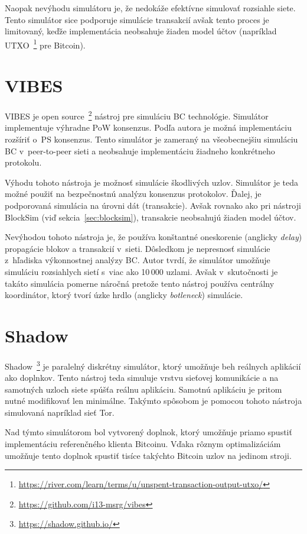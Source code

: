 Naopak nevýhodu simulátoru je, že nedokáže efektívne simulovať rozsiahle siete. Tento simulátor sice podporuje simulácie transakcií avšak tento proces je limitovaný, keďže implementácia neobsahuje žiaden model účtov (napríklad UTXO~\footnote{\url{https://river.com/learn/terms/u/unspent-transaction-output-utxo/}} pre Bitcoin).~\cite{fanPerfEval}

\section{VIBES}

VIBES je open source~\footnote{\url{https://github.com/i13-msrg/vibes}} nástroj pre simuláciu BC technológie. Simulátor implementuje výhradne PoW konsenzus. Podľa autora je možná implementáciu rozšíriť o~PS konsenzus. Tento simulátor je zameraný na všeobecnejšiu simuláciu BC v~peer-to-peer sieti a neobsahuje implementáciu žiadneho konkrétneho protokolu.~\cite{vibesWp}

Výhodu tohoto nástroja je možnosť simulácie škodlivých uzlov. Simulátor je teda možné použiť na bezpečnostnú analýzu konsenzus protokolov. Ďalej, je podporovaná simulácia na úrovni dát (transakcie). Avšak rovnako ako pri nástroji BlockSim (viď sekcia~\ref{sec:blocksim}), transakcie neobsahujú žiaden model účtov.

Nevýhodou tohoto nástroja je, že používa konštantné oneskorenie (anglicky \textit{delay}) propagácie blokov a transakcií v~sieti. Dôsledkom je nepresnosť simulácie z~hľadiska výkonnostnej analýzy BC. Autor tvrdí, že simulátor umožňuje simuláciu rozsiahlych sietí s~viac ako 10\,000 uzlami. Avšak v~skutočnosti je takáto simulácia pomerne náročná pretože tento nástroj používa centrálny koordinátor, ktorý tvorí úzke hrdlo (anglicky \textit{botleneck}) simulácie.\cite{fanPerfEval}

\section{Shadow}

Shadow~\footnote{\url{https://shadow.github.io/}} je paralelný diskrétny simulátor, ktorý umožňuje beh reálnych aplikácií ako doplnkov. Tento nástroj teda simuluje vrstvu sieťovej komunikácie a na samotných uzloch siete spúšťa reálnu aplikáciu. Samotnú aplikáciu je pritom nutné modifikovať len minimálne. Takýmto spôsobom je pomocou tohoto nástroja simulovaná napríklad sieť Tor.~\cite{shadowTor}

Nad týmto simulátorom bol vytvorený doplnok, ktorý umožňuje priamo spustiť implementáciu referenčného klienta Bitcoinu. Vďaka rôznym optimalizáciám umožňuje tento doplnok spustiť tisíce takýchto Bitcoin uzlov na jedinom stroji.

